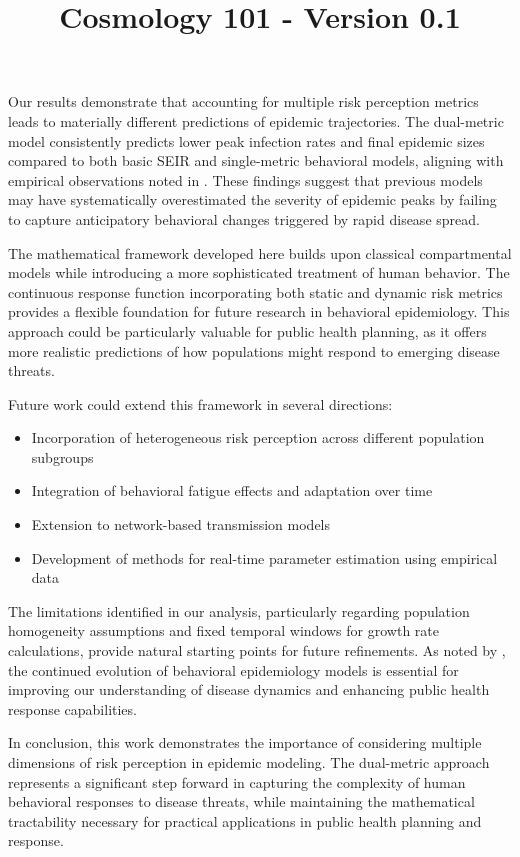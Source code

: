 \documentclass{article}\usepackage{graphicx} \usepackage{amsmath} \usepackage{colortbl}\title{Cosmology 101 - Version 0.1}
\begin{document}
Our results demonstrate that accounting for multiple risk perception metrics leads to materially different predictions of epidemic trajectories. The dual-metric model consistently predicts lower peak infection rates and final epidemic sizes compared to both basic SEIR and single-metric behavioral models, aligning with empirical observations noted in \cite{wang2020impact}. These findings suggest that previous models may have systematically overestimated the severity of epidemic peaks by failing to capture anticipatory behavioral changes triggered by rapid disease spread.

The mathematical framework developed here builds upon classical compartmental models \cite{anderson1992infectious} while introducing a more sophisticated treatment of human behavior. The continuous response function incorporating both static and dynamic risk metrics provides a flexible foundation for future research in behavioral epidemiology. This approach could be particularly valuable for public health planning, as it offers more realistic predictions of how populations might respond to emerging disease threats.

Future work could extend this framework in several directions:

\begin{itemize}
\item Incorporation of heterogeneous risk perception across different population subgroups
\item Integration of behavioral fatigue effects and adaptation over time
\item Extension to network-based transmission models
\item Development of methods for real-time parameter estimation using empirical data
\end{itemize}

The limitations identified in our analysis, particularly regarding population homogeneity assumptions and fixed temporal windows for growth rate calculations, provide natural starting points for future refinements. As noted by \cite{hethcote2000mathematics}, the continued evolution of behavioral epidemiology models is essential for improving our understanding of disease dynamics and enhancing public health response capabilities.

In conclusion, this work demonstrates the importance of considering multiple dimensions of risk perception in epidemic modeling. The dual-metric approach represents a significant step forward in capturing the complexity of human behavioral responses to disease threats, while maintaining the mathematical tractability necessary for practical applications in public health planning and response.
\end{document}
